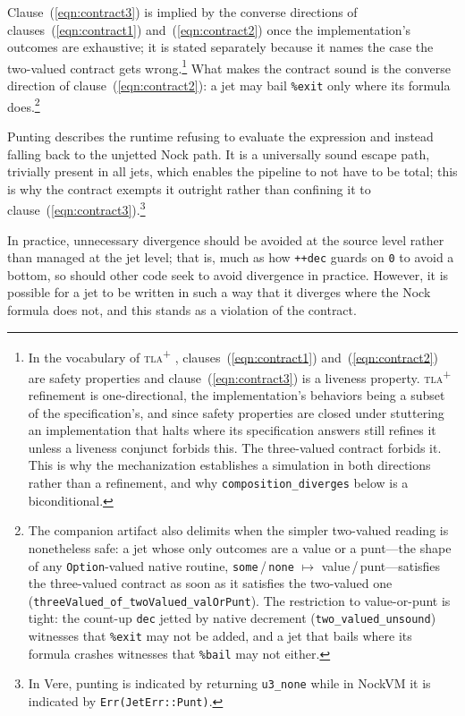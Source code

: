 \documentclass[twoside]{article}
\begin{document}
\noindent
Clause~(\ref{eqn:contract3}) is implied by the converse directions of clauses~(\ref{eqn:contract1}) and~(\ref{eqn:contract2}) once the implementation's outcomes are exhaustive; it is stated separately because it names the case the two-valued contract gets wrong.\footnote{In the vocabulary of \textsc{tla}\textsuperscript{+} \citep{Lamport2002}, clauses~(\ref{eqn:contract1}) and~(\ref{eqn:contract2}) are safety properties and clause~(\ref{eqn:contract3}) is a liveness property.  \textsc{tla}\textsuperscript{+} refinement is one-directional, the implementation's behaviors being a subset of the specification's, and since safety properties are closed under stuttering an implementation that halts where its specification answers still refines it unless a liveness conjunct forbids this.  The three-valued contract forbids it.  This is why the mechanization establishes a simulation in both directions rather than a refinement, and why \lstinline[style=inlinecode]{composition_diverges} below is a biconditional.}  What makes the contract sound is the converse direction of clause~(\ref{eqn:contract2}):  a jet may bail \lstinline[style=inlinecode]{%exit} only where its formula does.\footnote{The companion artifact also delimits when the simpler two-valued reading is nonetheless safe:  a jet whose only outcomes are a value or a punt---the shape of any \lstinline[style=inlinecode]{Option}-valued native routine, \texttt{some}\,/\,\texttt{none} $\mapsto$ value\,/\,punt---satisfies the three-valued contract as soon as it satisfies the two-valued one (\texttt{threeValued\_of\_twoValued\_valOrPunt}).  The restriction to value-or-punt is tight:  the count-up \texttt{dec} jetted by native decrement (\texttt{two\_valued\_unsound}) witnesses that \texttt{\%exit} may not be added, and a jet that bails where its formula crashes witnesses that \texttt{\%bail} may not either.}

Punting describes the runtime refusing to evaluate the expression and instead falling back to the unjetted Nock path.  It is a universally sound escape path, trivially present in all jets, which enables the pipeline to not have to be total; this is why the contract exempts it outright rather than confining it to clause~(\ref{eqn:contract3}).\footnote{In Vere, punting is indicated by returning \texttt{u3\_none} while in NockVM it is indicated by \texttt{Err(JetErr::Punt)}.}

In practice, unnecessary divergence should be avoided at the source level rather than managed at the jet level; that is, much as how \lstinline[style=inlinecode]{++dec} guards on \lstinline[style=inlinecode]{0} to avoid a bottom, so should other code seek to avoid divergence in practice.  However, it is possible for a jet to be written in such a way that it diverges where the Nock formula does not, and this stands as a violation of the contract.
\end{document}
